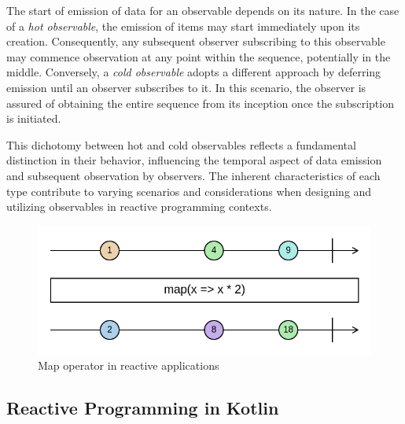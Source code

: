 \documentclass[12pt,a4paper,openright,twoside]{book}
\begin{document}
The start of emission of data for an observable depends on its nature. In the case of a \textit{hot observable}, the emission of items may start immediately upon its creation. Consequently, any subsequent observer subscribing to this observable may commence observation at any point within the sequence, potentially in the middle. Conversely, a \textit{cold observable} adopts a different approach by deferring emission until an observer subscribes to it. In this scenario, the observer is assured of obtaining the entire sequence from its inception once the subscription is initiated.

This dichotomy between hot and cold observables reflects a fundamental distinction in their behavior, influencing the temporal aspect of data emission and subsequent observation by observers. The inherent characteristics of each type contribute to varying scenarios and considerations when designing and utilizing observables in reactive programming contexts.

\begin{figure}
    \centering
    \includegraphics[width=\linewidth]{figures/map-marble.png}
    \caption{Map operator in reactive applications}
    \label{fig:reactive-map}
\end{figure}

\subsection{Reactive Programming in Kotlin}
\end{document}
